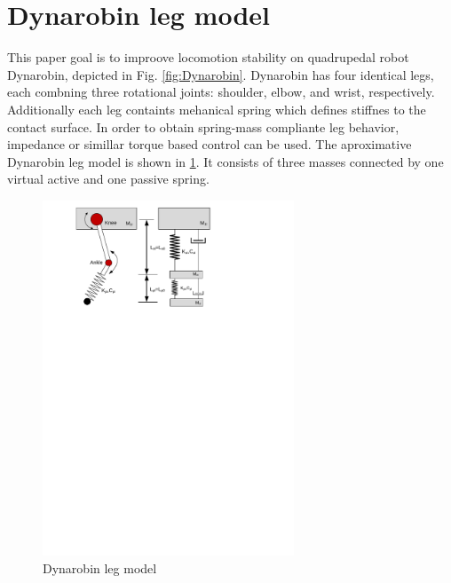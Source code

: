 
\section{Dynarobin leg model}

This paper goal is to improove locomotion stability on quadrupedal robot Dynarobin, depicted in Fig. \ref{fig:Dynarobin}. Dynarobin has four identical legs, each combning three rotational joints: shoulder, elbow, and wrist, respectively. Additionally each leg containts mehanical spring which defines stiffnes to the contact surface. In order to obtain spring-mass compliante leg behavior, impedance or simillar torque based control can be used. The aproximative Dynarobin leg model is shown in \ref{fig:DynarobinLEG}. It consists of three masses connected by one virtual active and one passive spring. 
\begin{figure}
	\centering
	\includegraphics[width=75mm]{./pictures/Dynarobin_leg.pdf}
	\caption{Dynarobin leg model}
	\label{fig:DynarobinLEG}
\end{figure}
